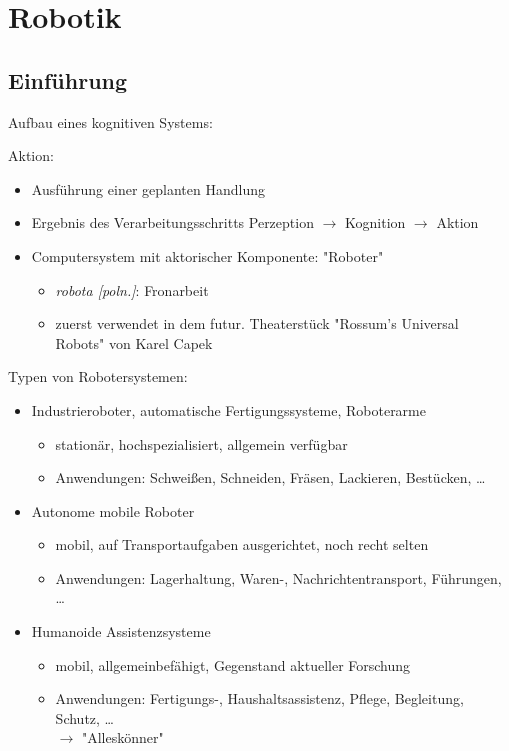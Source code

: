 
\section{Robotik}

\subsection{Einführung}

Aufbau eines kognitiven Systems:


Aktion:
\begin{itemize}
\item Ausführung einer geplanten Handlung
\item Ergebnis des Verarbeitungsschritts Perzeption $\to$ Kognition $\to$ Aktion
\item Computersystem mit aktorischer Komponente: "{}Roboter"{}
\begin{itemize}
\item \textsl{robota [poln.]}: Fronarbeit
\item zuerst verwendet in dem futur. Theaterstück "{}Rossum's Universal Robots"{} von Karel Capek
\end{itemize}
\end{itemize}

Typen von Robotersystemen:
\begin{itemize}
\item Industrieroboter, automatische Fertigungssysteme, Roboterarme
\begin{itemize}
\item stationär, hochspezialisiert, allgemein verfügbar
\item Anwendungen: Schweißen, Schneiden, Fräsen, Lackieren, Bestücken, \dots
\end{itemize}
\item Autonome mobile Roboter
\begin{itemize}
\item mobil, auf Transportaufgaben ausgerichtet, noch recht selten
\item Anwendungen: Lagerhaltung, Waren-, Nachrichtentransport, Führungen, \dots
\end{itemize}
\item Humanoide Assistenzsysteme
\begin{itemize}
\item mobil, allgemeinbefähigt, Gegenstand aktueller Forschung
\item Anwendungen: Fertigungs-, Haushaltsassistenz, Pflege, Begleitung, Schutz, \dots \\ $\to$ "{}Alleskönner"{}
\end{itemize}
\end{itemize}

